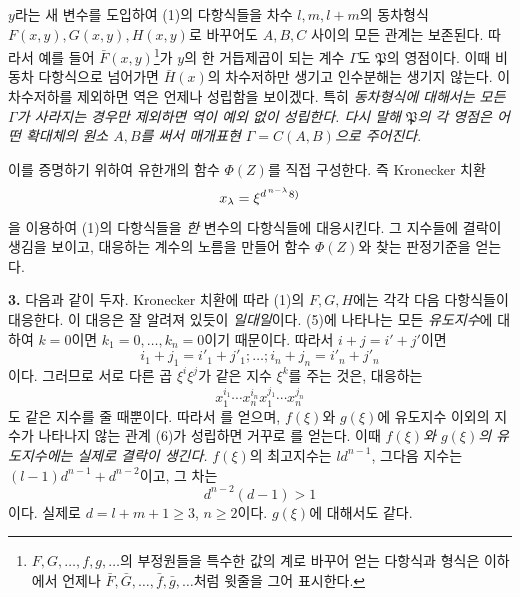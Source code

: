 \(y\)라는 새 변수를 도입하여 (1)의 다항식들을 차수 \(l,m,l+m\)의 동차형식 \(F(x,y),G(x,y),H(x,y)\)로 바꾸어도 \(A,B,C\) 사이의 모든 관계는 보존된다. 따라서 예를 들어 \(\bar F(x,y)\)\footnote{\(F,G,\ldots,f,g,\ldots\)의 부정원들을 특수한 값의 계로 바꾸어 얻는 다항식과 형식은 이하에서 언제나 \(\bar F,\bar G,\ldots,\bar f,\bar g,\ldots\)처럼 윗줄을 그어 표시한다.}가 \(y\)의 한 거듭제곱이 되는 계수 \(\Gamma\)도 \(\mathfrak P\)의 영점이다. 이때 비동차 다항식으로 넘어가면 \(\bar H(x)\)의 차수저하만 생기고 인수분해는 생기지 않는다. 이 차수저하를 제외하면 역은 언제나 성립함을 보이겠다. 특히 \emph{동차형식에 대해서는 모든 \(\Gamma\)가 사라지는 경우만 제외하면 역이 예외 없이 성립한다. 다시 말해 \(\mathfrak P\)의 각 영점은 어떤 확대체의 원소 \(A,B\)를 써서 매개표현 \(\Gamma=C(A,B)\)으로 주어진다}.
\addtocounter{footnote}{1}

이를 증명하기 위하여 유한개의 함수 \(\Phi(Z)\)를 직접 구성한다. 즉 Kronecker 치환
\[
x_\lambda=\xi^{d^{\,n-\lambda}}\srcfnmark{8)}
\]
을 이용하여 (1)의 다항식들을 \emph{한} 변수의 다항식들에 대응시킨다. 그 지수들에 결락이 생김을 보이고, 대응하는 계수의 노름을 만들어 함수 \(\Phi(Z)\)와 찾는 판정기준을 얻는다.
\addtocounter{footnote}{1}

\textbf{3.} 다음과 같이 두자.
Kronecker 치환에 따라 (1)의 \(F,G,H\)에는 각각 다음 다항식들이 대응한다.
이 대응은 잘 알려져 있듯이 \emph{일대일}이다. (5)에 나타나는 모든 \emph{유도지수}에 대하여 \(k=0\)이면 \(k_1=0,\ldots,k_n=0\)이기 때문이다. 따라서 \(i+j=i'+j'\)이면
\[
i_1+j_1=i'_1+j'_1;\ldots;i_n+j_n=i'_n+j'_n
\]
이다. 그러므로 서로 다른 곱 \(\xi^i\xi^j\)가 같은 지수 \(\xi^k\)를 주는 것은, 대응하는
\[
x_1^{i_1}\cdots x_n^{i_n}x_1^{j_1}\cdots x_n^{j_n}
\]
도 같은 지수를 줄 때뿐이다. 따라서
를 얻으며, \(f(\xi)\)와 \(g(\xi)\)에 유도지수 이외의 지수가 나타나지 않는 관계 (6)가 성립하면 거꾸로
를 얻는다. 이때 \emph{\(f(\xi)\)와 \(g(\xi)\)의 유도지수에는 실제로 결락이 생긴다.} \(f(\xi)\)의 최고지수는 \(ld^{n-1}\), 그다음 지수는 \((l-1)d^{n-1}+d^{n-2}\)이고, 그 차는
\[
d^{n-2}(d-1)>1
\]
이다. 실제로 \(d=l+m+1\ge3\), \(n\ge2\)이다. \(g(\xi)\)에 대해서도 같다.


